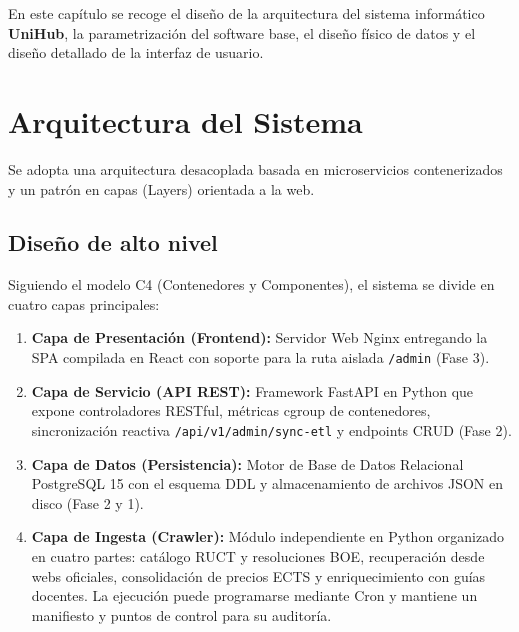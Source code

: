 En este capítulo se recoge el diseño de la arquitectura del sistema informático \textbf{UniHub}, la parametrización del software base, el diseño físico de datos y el diseño detallado de la interfaz de usuario.

\section{Arquitectura del Sistema}
Se adopta una arquitectura desacoplada basada en microservicios contenerizados y un patrón en capas (Layers) orientada a la web.

\subsection{Diseño de alto nivel}
Siguiendo el modelo C4 (Contenedores y Componentes), el sistema se divide en cuatro capas principales:
\begin{enumerate}
    \item \textbf{Capa de Presentación (Frontend):} Servidor Web Nginx entregando la SPA compilada en React con soporte para la ruta aislada \texttt{/admin} (Fase 3).
    \item \textbf{Capa de Servicio (API REST):} Framework FastAPI en Python que expone controladores RESTful, métricas cgroup de contenedores, sincronización reactiva \texttt{/api/v1/admin/sync-etl} y endpoints CRUD (Fase 2).
    \item \textbf{Capa de Datos (Persistencia):} Motor de Base de Datos Relacional PostgreSQL 15 con el esquema DDL y almacenamiento de archivos JSON en disco (Fase 2 y 1).
    \item \textbf{Capa de Ingesta (Crawler):} Módulo independiente en Python organizado en cuatro partes: catálogo RUCT y resoluciones BOE, recuperación desde webs oficiales, consolidación de precios ECTS y enriquecimiento con guías docentes. La ejecución puede programarse mediante Cron y mantiene un manifiesto y puntos de control para su auditoría.
\end{enumerate}

